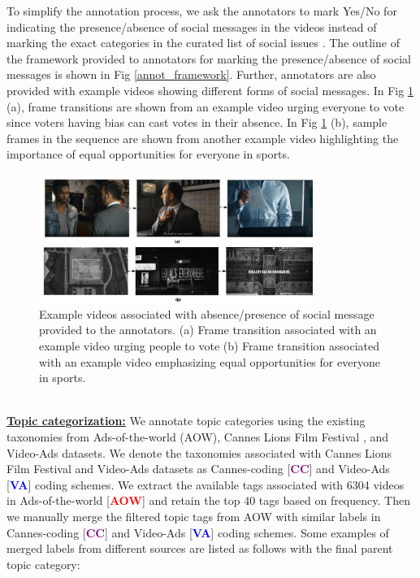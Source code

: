 To simplify the annotation process, we ask the annotators to mark Yes/No for indicating the presence/absence of social messages in the videos instead of marking the exact categories in the curated list of social issues \cite{ciment2006social}. The outline of the framework provided to annotators for marking the presence/absence of social messages is shown in Fig \ref{annot_framework}.
Further, annotators are also provided with example videos showing different forms of social messages. In Fig \ref{social_message} (a), frame transitions are shown from an example video urging everyone to vote since voters having bias can cast votes in their absence. In Fig  \ref{social_message} (b), sample frames in the sequence are shown from another example video highlighting the importance of equal opportunities for everyone in sports.
\begin{figure}[h!]
\centering
    \includegraphics[width=0.8\textwidth]{figures/new_social_message_image.pdf}
    \caption{Example videos associated with absence/presence of social message provided to the annotators. (a) Frame transition associated with an example video urging people to vote (b) Frame transition associated with an example video emphasizing equal opportunities for everyone in sports.}
    \label{social_message}
\end{figure}
\\
\textbf{\underline{Topic categorization:}}
We annotate topic categories using the existing taxonomies from Ads-of-the-world (AOW), Cannes Lions Film Festival \cite{cannes-lions}, and Video-Ads \cite{Hussain2017AutomaticUO} datasets. We denote the taxonomies associated with Cannes Lions Film Festival and Video-Ads datasets as Cannes-coding [\textcolor{purple}{\textbf{CC}}] and Video-Ads [\textcolor{blue}{\textbf{VA}}] coding schemes. 
We extract the available tags associated with 6304 videos in Ads-of-the-world [\textcolor{red}{\textbf{AOW}}] and retain the top 40 tags based on frequency. Then we manually merge the filtered topic tags from AOW with similar labels in Cannes-coding  [\textcolor{purple}{\textbf{CC}}] and Video-Ads [\textcolor{blue}{\textbf{VA}}] coding schemes. Some examples of merged labels from different sources are listed as follows with the final parent topic category:
